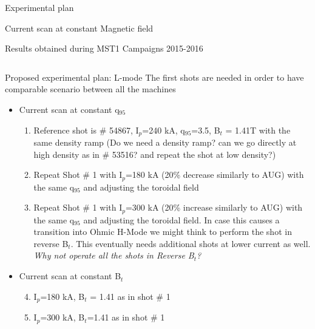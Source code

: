 \documentclass[10pt, compress]{beamer}
\newcommand\Fontvi{\fontsize{8}{7.2}\selectfont}
\begin{document}
\begin{frame}{Experimental plan}
\begin{frame}{Current scan at constant Magnetic field}
\begin{frame}{Results obtained during MST1 Campaigns 2015-2016}
\begin{columns}
\begin{column}{0.4\textwidth}
\begin{itemize}
      \end{itemize}
    \end{column}
  \end{columns}
\end{frame}


\begin{frame}{Proposed experimental plan: L-mode}
  \Fontvi
  The first shots are needed in order to have comparable scenario
  between all the machines
  \begin{itemize}
    \item Current scan at constant q$_{95}$
      \begin{enumerate}
      \item Reference shot is \# 54867, I$_p$=240 kA, q$_{95}$=3.5,
        B$_t$ = 1.41T with the same density ramp (\alert{Do we need a density ramp? can we
          go directly at high density as in \# 53516? and repeat the
          shot at low density?})
      \item Repeat Shot \# 1 with I$_p$=180 kA (20\% decrease similarly
        to AUG) with the same q$_{95}$ and adjusting the toroidal field
      \item Repeat Shot \# 1 with I$_p$=300 kA (20\% increase similarly
        to AUG) with the same q$_{95}$ and adjusting the toroidal
        field. \alert{In case this causes a transition into Ohmic H-Mode we
        might think to perform the shot in reverse B$_t$. This
        eventually needs additional shots at lower current as
        well. \emph{Why not operate all the shots in Reverse B$_t$?}}
      \end{enumerate}
    \item Current scan at constant B$_t$
      \begin{enumerate}
        \setcounter{enumi}{3}
      \item I$_p$=180 kA,  B$_t$ = 1.41 as in shot \# 1 
      \item I$_p$=300 kA, B$_t$=1.41 as in shot \# 1
      \end{enumerate}
    \end{itemize}      
  \end{frame}


\end{frame}
\end{frame}
\end{document}
